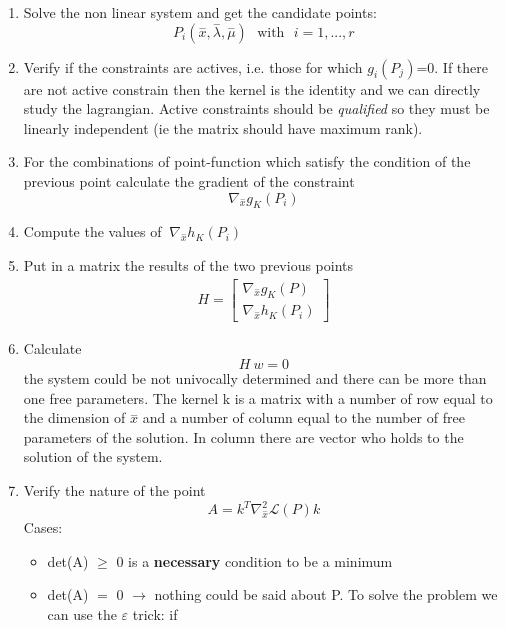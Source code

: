 \documentclass[a4paper,12pt]{article}
\begin{document}
\begin{enumerate}
		
		\item Solve the non linear system and get the candidate points:
		\begin{equation}
			P_{i}(\stackrel{-}{x},\stackrel{-}{\lambda},\stackrel{-}{\mu}) \ \ \ \text{with} \ \ \ i=1,...,r
		\end{equation}
		\item Verify if the constraints are actives, i.e. those for which $g_{i}(P_{j})$=0. If there are not active constrain then the kernel is the identity and we can directly study the lagrangian. Active constraints should be \textit{qualified} so they must be linearly independent (ie the matrix should have maximum rank).
		\item For the combinations of point-function which satisfy the condition of the previous point calculate the gradient of the constraint 
		\begin{equation}
			\nabla_{\stackrel{-}{x}} g_K(P_i)
		\end{equation}
		\item Compute the values of $ \ \nabla_{\stackrel{-}{x}} h_K(P_i)$
		\item Put in a matrix the results of the two previous points
		\begin{align}
			H = \begin{bmatrix}
				\nabla_{\stackrel{-}{x}} g_K(P)\\
				\nabla_{\stackrel{-}{x}} h_K(P_i)
			\end{bmatrix}
		\end{align}
		\item Calculate
		\begin{equation}
			H \ w = 0
		\end{equation}
		the system could be not univocally determined and there can be more than one free parameters. The kernel k is a matrix with a number of row equal to the dimension of $\stackrel{-}{x}$ and a number of column equal to the number of free parameters of the solution. In column there are vector who holds to the solution of the system.
		\item Verify the nature of the point
		\begin{equation}
			A=k^T\nabla_{\stackrel{-}{x}}^2\mathcal{L}(P)k
		\end{equation}
		Cases:
		\begin{itemize}
			\item det(A) $\ge$ 0 is a \textbf{necessary} condition to be a minimum
			\item det(A) $=$ 0 $\rightarrow$ nothing could be said about P. To solve the problem we can use the $\varepsilon$ trick: if

\end{itemize}
\end{enumerate}
\end{document}
